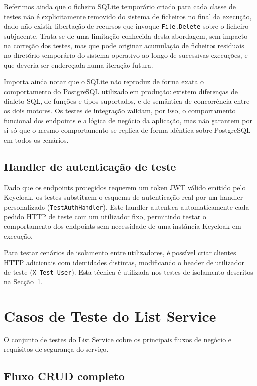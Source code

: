Referimos ainda que o ficheiro SQLite temporário criado para cada classe de testes não é explicitamente removido do sistema de ficheiros no final da execução, dado não existir libertação de recursos que invoque \texttt{File.Delete} sobre o ficheiro subjacente. Trata-se de uma limitação conhecida desta abordagem, sem impacto na correção dos testes, mas que pode originar acumulação de ficheiros residuais no diretório temporário do sistema operativo ao longo de sucessivas execuções, e que deveria ser endereçada numa iteração futura.

Importa ainda notar que o SQLite não reproduz de forma exata o comportamento do PostgreSQL utilizado em produção: existem diferenças de dialeto SQL, de funções e tipos suportados, e de semântica de concorrência entre os dois motores. Os testes de integração validam, por isso, o comportamento funcional dos endpoints e a lógica de negócio da aplicação, mas não garantem por si só que o mesmo comportamento se replica de forma idêntica sobre PostgreSQL em todos os cenários.

\subsection{Handler de autenticação de teste}
\label{sec:6.2.2}

Dado que os endpoints protegidos requerem um token \ac{JWT} válido emitido pelo Keycloak, os testes substituem o esquema de autenticação real por um handler personalizado (\texttt{TestAuthHandler}). Este handler autentica automaticamente cada pedido HTTP de teste com um utilizador fixo, permitindo testar o comportamento dos endpoints sem necessidade de uma instância Keycloak em execução.

Para testar cenários de isolamento entre utilizadores, é possível criar clientes HTTP adicionais com identidades distintas, modificando o header de utilizador de teste (\texttt{X-Test-User}). Esta técnica é utilizada nos testes de isolamento descritos na Secção~\ref{sec:6.3}.

\section{Casos de Teste do List Service}
\label{sec:6.3}

O conjunto de testes do List Service cobre os principais fluxos de negócio e requisitos de segurança do serviço.

\subsection{Fluxo CRUD completo}
\label{sec:6.3.1}

